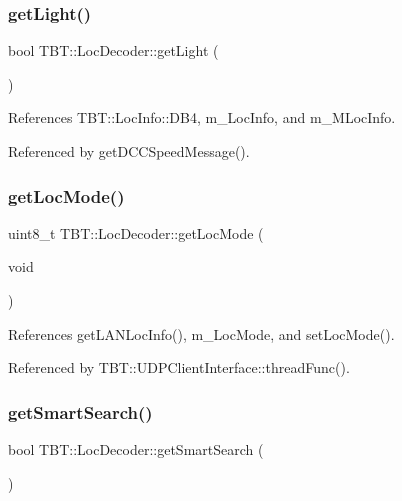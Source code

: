 \subsubsection{\texorpdfstring{get\+Light()}{getLight()}}
{\footnotesize\ttfamily bool T\+B\+T\+::\+Loc\+Decoder\+::get\+Light (\begin{DoxyParamCaption}{ }\end{DoxyParamCaption})\hspace{0.3cm}{\ttfamily [inline]}}



References T\+B\+T\+::\+Loc\+Info\+::\+D\+B4, m\+\_\+\+Loc\+Info, and m\+\_\+\+M\+Loc\+Info.



Referenced by get\+D\+C\+C\+Speed\+Message().

\mbox{\label{classTBT_1_1LocDecoder_afaa04ad0561a39212d69d0aabece751e_afaa04ad0561a39212d69d0aabece751e}} 
\subsubsection{\texorpdfstring{get\+Loc\+Mode()}{getLocMode()}}
{\footnotesize\ttfamily uint8\+\_\+t T\+B\+T\+::\+Loc\+Decoder\+::get\+Loc\+Mode (\begin{DoxyParamCaption}\item[{void}]{ }\end{DoxyParamCaption})\hspace{0.3cm}{\ttfamily [inline]}}



References get\+L\+A\+N\+Loc\+Info(), m\+\_\+\+Loc\+Mode, and set\+Loc\+Mode().



Referenced by T\+B\+T\+::\+U\+D\+P\+Client\+Interface\+::thread\+Func().

\mbox{\label{classTBT_1_1LocDecoder_ab0a2b2953657fbc2589f90918883d03a_ab0a2b2953657fbc2589f90918883d03a}} 
\subsubsection{\texorpdfstring{get\+Smart\+Search()}{getSmartSearch()}}
{\footnotesize\ttfamily bool T\+B\+T\+::\+Loc\+Decoder\+::get\+Smart\+Search (\begin{DoxyParamCaption}{ }\end{DoxyParamCaption})\hspace{0.3cm}{\ttfamily [inline]}}



